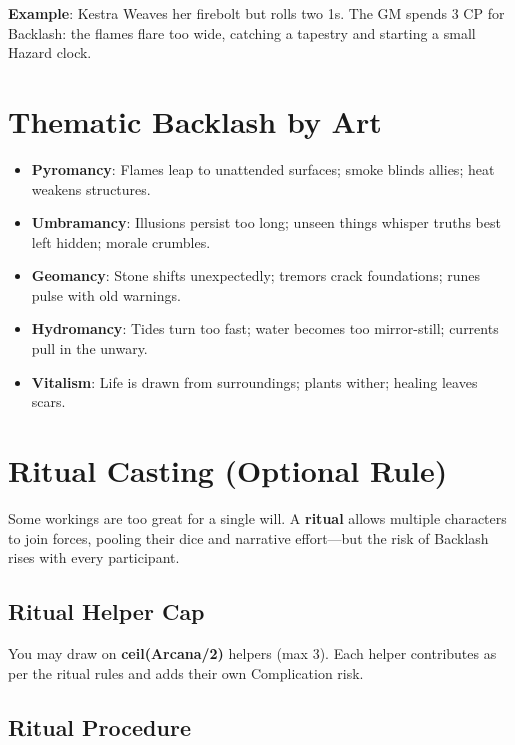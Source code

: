 \textbf{Example}: Kestra Weaves her firebolt but rolls two 1s. The GM spends 3 CP for Backlash: the flames flare too wide, catching a tapestry and starting a small Hazard clock.

\section*{Thematic Backlash by Art}

\begin{itemize}
    \item \textbf{Pyromancy}: Flames leap to unattended surfaces; smoke blinds allies; heat weakens structures.
    \item \textbf{Umbramancy}: Illusions persist too long; unseen things whisper truths best left hidden; morale crumbles.
    \item \textbf{Geomancy}: Stone shifts unexpectedly; tremors crack foundations; runes pulse with old warnings.
    \item \textbf{Hydromancy}: Tides turn too fast; water becomes too mirror-still; currents pull in the unwary.
    \item \textbf{Vitalism}: Life is drawn from surroundings; plants wither; healing leaves scars.
\end{itemize}

\section*{Ritual Casting (Optional Rule)}

Some workings are too great for a single will. A \textbf{ritual} allows multiple characters to join forces, pooling their dice and narrative effort—but the risk of Backlash rises with every participant.

\subsection*{Ritual Helper Cap}

You may draw on \textbf{ceil(Arcana/2)} helpers (max 3). Each helper contributes as per the ritual rules and adds their own Complication risk.

\subsection*{Ritual Procedure}

